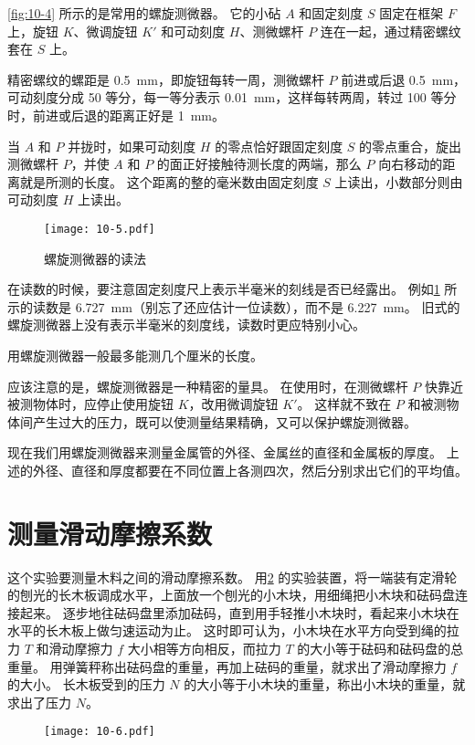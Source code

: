 \cref{fig:10-4} 所示的是常用的螺旋测微器。
它的小砧 $A$ 和固定刻度 $S$ 固定在框架 $F$ 上，旋钮 $K$、微调旋钮 $K'$ 和可动刻度 $H$、测微螺杆 $P$ 连在一起，通过精密螺纹套在 $S$ 上。

精密螺纹的螺距是 \qty{0.5}{mm}，即旋钮每转一周，测微螺杆 $P$ 前进或后退 
\qty{0.5}{mm}，可动刻度分成 50 等分，每一等分表示 \qty{0.01}{mm}，这样每转两周，转过 100 等分时，前进或后退的距离正好是 \qty{1}{mm}。

当 $A$ 和 $P$ 并拢时，如果可动刻度 $H$ 的零点恰好跟固定刻度 $S$ 的零点重合，旋出测微螺杆 $P$，并使 $A$ 和 $P$ 的面正好接触待测长度的两端，那么 $P$ 向右移动的距离就是所测的长度。
这个距离的整的毫米数由固定刻度 $S$ 上读出，小数部分则由可动刻度 $H$ 上读出。
\begin{figure}
  \texttt{[image: 10-5.pdf]}
  \caption{螺旋测微器的读法}\label{fig:10-5}
\end{figure}

在读数的时候，要注意固定刻度尺上表示半毫米的刻线是否已经露出。
例如\cref{fig:10-5} 所示的读数是 \qty{6.727}{mm}（别忘了还应估计一位读数），而不是 \qty{6.227}{mm}。
旧式的螺旋测微器上没有表示半毫米的刻度线，读数时更应特别小心。

用螺旋测微器一般最多能测几个厘米的长度。

应该注意的是，螺旋测微器是一种精密的量具。
在使用时，在测微螺杆 $P$ 快靠近被测物体时，应停止使用旋钮 $K$，改用微调旋钮 $K'$。
这样就不致在 $P$ 和被测物体间产生过大的压力，既可以使测量结果精确，又可以保护螺旋测微器。

现在我们用螺旋测微器来测量金属管的外径、金属丝的直径和金属板的厚度。
上述的外径、直径和厚度都要在不同位置上各测四次，然后分别求出它们的平均值。

\section{测量滑动摩擦系数}

这个实验要测量木料之间的滑动摩擦系数。
用\cref{fig:10-6} 的实验装置，将一端装有定滑轮的刨光的长木板调成水平，上面放一个刨光的小木块，用细绳把小木块和砝码盘连接起来。
逐步地往砝码盘里添加砝码，直到用手轻推小木块时，看起来小木块在水平的长木板上做匀速运动为止。
这时即可认为，小木块在水平方向受到绳的拉力 $T$ 和滑动摩擦力 $f$ 大小相等方向相反，而拉力 $T$ 的大小等于砝码和砝码盘的总重量。
用弹簧秤称出砝码盘的重量，再加上砝码的重量，就求出了滑动摩擦力 $f$ 的大小。
长木板受到的压力 $N$ 的大小等于小木块的重量，称出小木块的重量，就求出了压力 $N$。
\begin{figure}
  \texttt{[image: 10-6.pdf]}
\caption{}\label{fig:10-6}
\end{figure}

